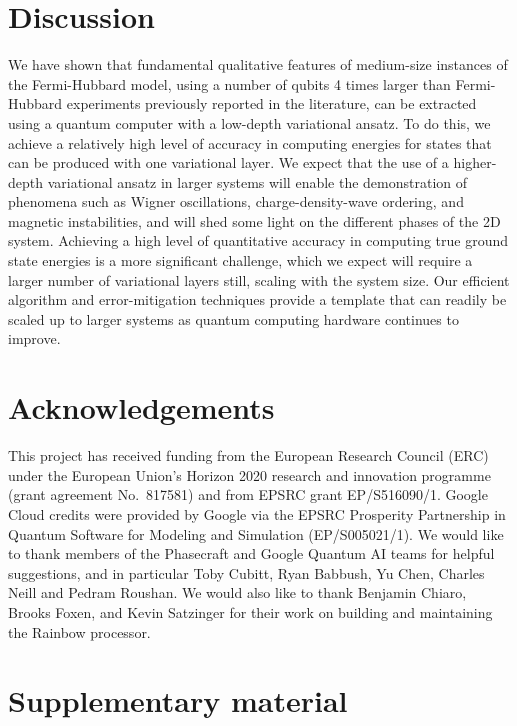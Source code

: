 \documentclass[aps,prb,twoside,superscriptaddress,longbibliography,nofootinbib,floatfix, notitlepage,twocolumn]{revtex4-1}
\begin{document}
\section{Discussion}

We have shown that fundamental qualitative features of medium-size instances of the Fermi-Hubbard model, using a number of qubits 4 times larger than Fermi-Hubbard experiments previously reported in the literature, can be extracted using a quantum computer with a low-depth variational ansatz. To do this, we achieve a relatively high level of accuracy in computing energies for states that can be produced with one variational layer. We expect that the use of a higher-depth variational ansatz in larger systems will enable the demonstration of phenomena such as Wigner oscillations, charge-density-wave ordering, and magnetic instabilities, and will shed some light on the different phases of the 2D system. Achieving a high level of quantitative accuracy in computing true ground state energies is a more significant challenge, which we expect will require a larger number of variational layers still, scaling with the system size\cite{cade20}. Our efficient algorithm and error-mitigation techniques provide a template that can readily be scaled up to larger systems as quantum computing hardware continues to improve.

\section*{Acknowledgements}

This project has received funding from the European Research Council (ERC) under the European Union's Horizon 2020 research and innovation programme (grant agreement No.\ 817581) and from EPSRC grant EP/S516090/1. Google Cloud credits were provided by Google via the EPSRC Prosperity Partnership in Quantum Software for Modeling and Simulation (EP/S005021/1). We would like to thank members of the Phasecraft and Google Quantum AI teams for helpful suggestions, and in particular Toby Cubitt, Ryan Babbush, Yu Chen, Charles Neill and Pedram Roushan. We would also like to thank Benjamin Chiaro, Brooks Foxen, and Kevin Satzinger for their work on building and maintaining the Rainbow processor.



\newpage
\appendix

\section*{Supplementary material}
\end{document}
